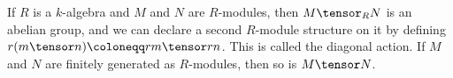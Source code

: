 If $R$ is a $k$-algebra and $M$ and $N$ are $R$-modules, then $M\tensor_R N$ is
an abelian group, and we can declare a second $R$-module structure on it
by defining $r(m\tensor n)\coloneqq rm\tensor rn$. This is called the diagonal
action. If $M$ and $N$ are finitely generated as $R$-modules, then so is
$M\tensor N$.
